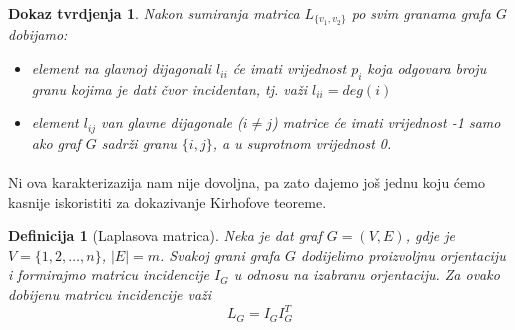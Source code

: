 \documentclass[11pt]{article}
\newtheorem{definition}{Definicija}
\newtheorem*{custom_proof}{Dokaz tvrdjenja}
\begin{document}
			\begin{custom_proof}
			Nakon sumiranja matrica $L_{\{v_1,v_2\}}$ po svim granama grafa $G$ dobijamo:
				\begin{itemize}
				\item element na glavnoj dijagonali $l_{ii}$ će imati vrijednost $p_i$ koja odgovara broju granu kojima je dati čvor incidentan, tj. važi $l_{ii} = deg(i)$
				\item element $l_{ij}$ van glavne dijagonale ($i \neq j$) matrice će imati vrijednost -1 samo ako graf $G$ sadrži granu $\{i,j\}$, a u suprotnom vrijednost 0.  
				\end{itemize}
			\end{custom_proof}
		
			\paragraph{}
			Ni ova karakterizazija nam nije dovoljna, pa zato dajemo još jednu koju ćemo kasnije iskoristiti za dokazivanje Kirhofove teoreme.
	
			\begin{definition}[Laplasova matrica] 
			Neka je dat graf $G = (V, E)$, gdje je $V = \{1, 2, \dots, n\}$, $|E| = m$. Svakoj grani grafa $G$ dodijelimo proizvoljnu orjentaciju i formirajmo matricu incidencije $I_G$ u odnosu na izabranu orjentaciju.
			Za ovako dobijenu matricu incidencije važi
			 \[
				 L_G = I_G I_G^T
			 \]
			\end{definition}
	
\end{document}
